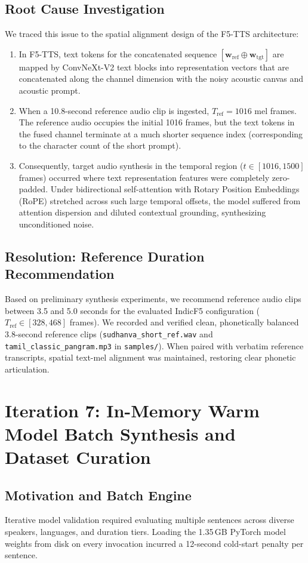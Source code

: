 \subsection{Root Cause Investigation}
We traced this issue to the spatial alignment design of the F5-TTS architecture:
\begin{enumerate}
    \item In F5-TTS, text tokens for the concatenated sequence $[\mathbf{w}_{\text{ref}} \oplus \mathbf{w}_{\text{tgt}}]$ are mapped by ConvNeXt-V2 text blocks into representation vectors that are concatenated along the channel dimension with the noisy acoustic canvas and acoustic prompt.
    \item When a 10.8-second reference audio clip is ingested, $T_{\text{ref}} = 1016$ mel frames. The reference audio occupies the initial 1016 frames, but the text tokens in the fused channel terminate at a much shorter sequence index (corresponding to the character count of the short prompt).
    \item Consequently, target audio synthesis in the temporal region ($t \in [1016, 1500]$ frames) occurred where text representation features were completely zero-padded. Under bidirectional self-attention with Rotary Position Embeddings (RoPE) stretched across such large temporal offsets, the model suffered from attention dispersion and diluted contextual grounding, synthesizing unconditioned noise.
\end{enumerate}

\subsection{Resolution: Reference Duration Recommendation}
Based on preliminary synthesis experiments, we recommend reference audio clips between 3.5 and 5.0 seconds for the evaluated IndicF5 configuration ($T_{\text{ref}} \in [328, 468]$ frames). We recorded and verified clean, phonetically balanced 3.8-second reference clips (\texttt{sudhanva\_short\_ref.wav} and \texttt{tamil\_classic\_pangram.mp3} in \texttt{samples/}). When paired with verbatim reference transcripts, spatial text-mel alignment was maintained, restoring clear phonetic articulation.

\section{Iteration 7: In-Memory Warm Model Batch Synthesis and Dataset Curation}
\subsection{Motivation and Batch Engine}
Iterative model validation required evaluating multiple sentences across diverse speakers, languages, and duration tiers. Loading the 1.35\,GB PyTorch model weights from disk on every invocation incurred a 12-second cold-start penalty per sentence.

